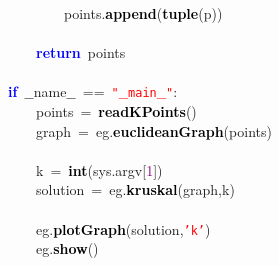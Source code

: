 \mbox{}\ \ \ \ \ \ \ \ points\textcolor{BrickRed}{.}\textbf{\textcolor{Black}{append}}\textcolor{BrickRed}{(}\textbf{\textcolor{Black}{tuple}}\textcolor{BrickRed}{(}p\textcolor{BrickRed}{))} \\
\mbox{} \\
\mbox{}\ \ \ \ \textbf{\textcolor{Blue}{return}}\ points \\
\mbox{} \\
\mbox{}\textbf{\textcolor{Blue}{if}}\ $\_$$\_$name$\_$$\_$\ \textcolor{BrickRed}{==}\ \texttt{\textcolor{Red}{"{}$\_$$\_$main$\_$$\_$"{}}}\textcolor{BrickRed}{:} \\
\mbox{}\ \ \ \ points\ \textcolor{BrickRed}{=}\ \textbf{\textcolor{Black}{readKPoints}}\textcolor{BrickRed}{()} \\
\mbox{}\ \ \ \ graph\ \textcolor{BrickRed}{=}\ eg\textcolor{BrickRed}{.}\textbf{\textcolor{Black}{euclideanGraph}}\textcolor{BrickRed}{(}points\textcolor{BrickRed}{)} \\
\mbox{}\ \ \ \  \\
\mbox{}\ \ \ \ k\ \textcolor{BrickRed}{=}\ \textbf{\textcolor{Black}{int}}\textcolor{BrickRed}{(}sys\textcolor{BrickRed}{.}argv\textcolor{BrickRed}{[}\textcolor{Purple}{1}\textcolor{BrickRed}{])} \\
\mbox{}\ \ \ \ solution\ \textcolor{BrickRed}{=}\ eg\textcolor{BrickRed}{.}\textbf{\textcolor{Black}{kruskal}}\textcolor{BrickRed}{(}graph\textcolor{BrickRed}{,}k\textcolor{BrickRed}{)} \\
\mbox{} \\
\mbox{}\ \ \ \ eg\textcolor{BrickRed}{.}\textbf{\textcolor{Black}{plotGraph}}\textcolor{BrickRed}{(}solution\textcolor{BrickRed}{,}\texttt{\textcolor{Red}{'k'}}\textcolor{BrickRed}{)} \\
\mbox{}\ \ \ \ eg\textcolor{BrickRed}{.}\textbf{\textcolor{Black}{show}}\textcolor{BrickRed}{()} \\
\mbox{}\ \ \ \  \\
\mbox{}
